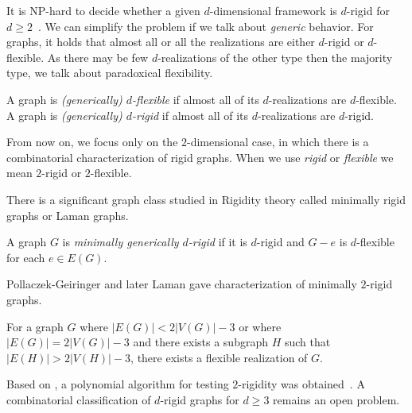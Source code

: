 It is NP-hard to decide whether a given \( d \)-dimensional framework is
\( d \)-rigid for \( d \ge 2 \)~\cite{d_rigidity_hardness}.
We can simplify the problem if we talk about \emph{generic} behavior.
%
For graphs, it holds that almost all or all the realizations are
either \( d \)-rigid or \( d \)-flexible.
As there may be few \( d \)-realizations of the other type then the majority type,
we talk about paradoxical flexibility.
%
\begin{definition}
	A graph is \emph{(generically) \( d \)-flexible} if almost all of
	its \( d \)-realizations are \( d \)-flexible.
	A graph is \emph{(generically) \( d \)-rigid} if almost all of
	its \( d \)-realizations are \( d \)-rigid.
\end{definition}
%


From now on, we focus only on the \( 2 \)-dimensional case,
in which there is a combinatorial characterization of rigid graphs.
When we use \emph{rigid} or \emph{flexible} we mean \( 2 \)-rigid or \( 2 \)-flexible.

There is a significant graph class studied in Rigidity theory
called minimally rigid graphs or Laman graphs.
%
\begin{definition}
	A graph \( G \) is \emph{minimally generically \( d \)-rigid} if it is \( d \)-rigid
	and \( G - e \) is \(d\)-flexible for each \( e \in E(G) \).
\end{definition}
%
Pollaczek-Geiringer and later Laman gave characterization of minimally $2$-rigid graphs.
%
%
\begin{corollary}
	For a graph \( G \) where \( |E(G)| < 2|V(G)| - 3 \) or
	where \( |E(G)| = 2|V(G)| - 3 \) and there exists a subgraph \( H \) such that \( |E(H)| > 2|V(H)| - 3 \),
	there exists a flexible realization of \( G \).
\end{corollary}
%
Based on ,
a polynomial algorithm
for testing $2$-rigidity was obtained~\cite{polynomial-min-rigid}.
A combinatorial classification of $d$-rigid graphs
for $d \geq 3$ remains an open problem.

